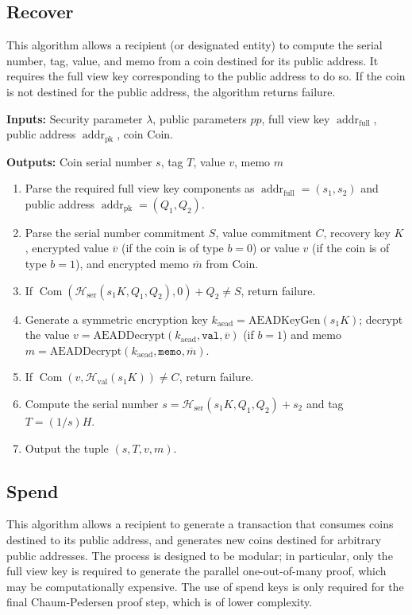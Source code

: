 \documentclass{llncs}
\newcommand{\hash}{\mathcal{H}}
\newcommand{\addr}{\operatorname{addr}}
\newcommand{\com}{\operatorname{Com}}
\begin{document}
\subsection{Recover}

This algorithm allows a recipient (or designated entity) to compute the serial number, tag, value, and memo from a coin destined for its public address.
It requires the full view key corresponding to the public address to do so.
If the coin is not destined for the public address, the algorithm returns failure.

\textbf{Inputs:} Security parameter $\lambda$, public parameters $pp$, full view key $\addr_{\text{full}}$, public address $\addr_{\text{pk}}$, coin $\text{Coin}$.

\textbf{Outputs:} Coin serial number $s$, tag $T$, value $v$, memo $m$

\begin{enumerate}
\item Parse the required full view key components as $\addr_{\text{full}} = (s_1, s_2)$ and public address $\addr_{\text{pk}} = (Q_1, Q_2)$.
\item Parse the serial number commitment $S$, value commitment $C$, recovery key $K$, encrypted value $\overline{v}$ (if the coin is of type $b=0$) or value $v$ (if the coin is of type $b=1$), and encrypted memo $\overline{m}$ from $\text{Coin}$.
\item If $\com(\hash_{\text{ser}}(s_1 K,Q_1,Q_2), 0) + Q_2 \neq S$, return failure.
\item Generate a symmetric encryption key $k_{\text{aead}} = \text{AEADKeyGen}(s_1 K)$; decrypt the value $v = \text{AEADDecrypt}(k_{\text{aead}},\texttt{val},\overline{v})$ (if $b=1$) and memo $m = \text{AEADDecrypt}(k_{\text{aead}},\texttt{memo},\overline{m})$.
\item If $\com(v,\hash_{\text{val}}(s_1 K)) \neq C$, return failure.
\item Compute the serial number $s = \hash_{\text{ser}}(s_1 K,Q_1,Q_2) + s_2$ and tag $T = (1/s)H$.
\item Output the tuple $(s, T, v, m)$.
\end{enumerate}


\subsection{Spend}

This algorithm allows a recipient to generate a transaction that consumes coins destined to its public address, and generates new coins destined for arbitrary public addresses.
The process is designed to be modular; in particular, only the full view key is required to generate the parallel one-out-of-many proof, which may be computationally expensive.
The use of spend keys is only required for the final Chaum-Pedersen proof step, which is of lower complexity.
\end{document}
